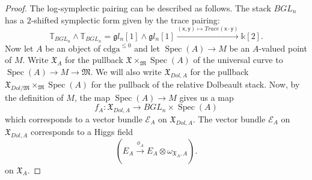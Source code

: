 \documentclass[11pt]{amsart}
\newcommand  {\cdga}     {\mathrm{cdga}}
\DeclareMathOperator{\Spec}{Spec}
\theoremstyle{plain}
\numberwithin{equation}{section}
\theoremstyle{definition}
\theoremstyle{plain}
\begin{document}
\begin{proof}
The log-symplectic pairing can be described as follows. The stack $BGL_n$ has a $2$-shifted symplectic form given by the trace pairing:
\begin{equation}\label{BG}
\mathbb{T}_{BGL_n}\wedge \mathbb{T}_{BGL_n}=\mathfrak gl_n[1]\wedge \mathfrak gl_n[1]\xrightarrow{(\mathsf x,\mathsf y)\mapsto Trace(\mathsf x\cdot \mathsf y)} \mathbb k[2].
\end{equation}
Now let $A$ be an object of $\cdga^{\leq 0}$ and let $\Spec(A) \to M$ be an $A$-valued point of $M$. Write $\mathfrak{X}_{A}$ for the pullback $\mathfrak{X}\times_{\mathfrak{M}} \Spec(A)$ of the universal curve to 
$\Spec(A) \to M \to \mathfrak{M}$. We will also write 
$\mathfrak{X}_{Dol, A}$ for the pullback $\mathfrak{X}_{Dol/\mathfrak{M}}\times_{\mathfrak{M}} \Spec(A)$ for the pullback of the relative Dolbeault stack. Now, by the definition of $M$, the map $\Spec(A) \to M$ gives us a map \[f_A: \mathfrak{X}_{Dol,A}\longrightarrow BGL_n\times \Spec (A)\] which corresponds to a vector bundle $\mathcal{E}_A$ on $\mathfrak X_{Dol, A}$. The vector bundle $\mathcal E_A$ on $\mathfrak X_{Dol, A}$ corresponds to a Higgs field \[
(E_{A} \xrightarrow{\phi_A} E_{A}\otimes \omega_{\mathfrak{X}_A , A}).
\]
on $\mathfrak X_A$.


\end{proof}
\end{document}
